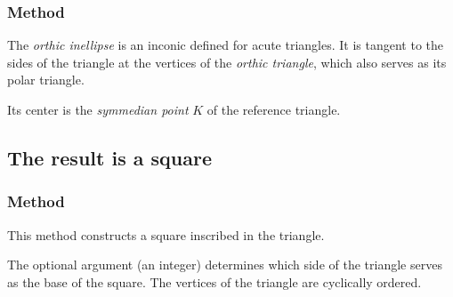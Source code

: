 \subsubsection{Method }
\label{ssub:method_triangle_orthic__inellipse}

The \emph{orthic inellipse} is an inconic defined for acute triangles. It is tangent to the sides of the triangle at the vertices of the \emph{orthic triangle}, which also serves as its polar triangle.

\medskip
\noindent
Its center is the \emph{symmedian point} $K$ of the reference triangle.

\vspace{1em}


\begin{tkzexample}[latex=.5\textwidth]
\end{tkzexample}




\subsection{The result is a square}

\subsubsection{Method }
\label{ssub:method_triangle_square__inscribed}

This method constructs a square inscribed in the triangle.

\medskip
\noindent
The optional argument  (an integer) determines which side of the triangle serves as the base of the square. The vertices of the triangle are cyclically ordered.

